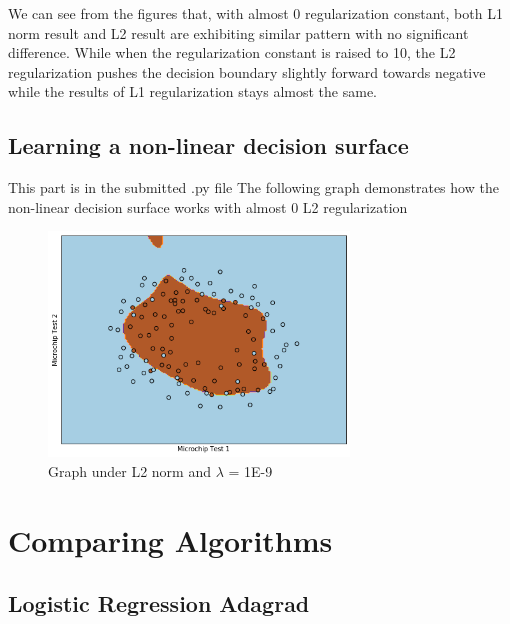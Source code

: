 \documentclass{article}
\begin{document}
	We can see from the figures that, with almost 0 regularization constant, both L1 norm result and L2 result are exhibiting similar pattern with no significant difference. While when the regularization constant is raised to 10, the L2 regularization pushes the decision boundary slightly forward towards negative while the results of L1 regularization stays almost the same.
	
	\subsection{Learning a non-linear decision surface}
	This part is in the submitted .py file
	The following graph demonstrates how the non-linear decision surface works with almost 0 L2 regularization
	\begin{figure}[H]
			\caption{Graph under L2 norm and $\lambda$ = 1E-9}
			\centering
			\includegraphics[width=8cm]{NonlinearL2norm0.png}
		\end{figure}
	\section{Comparing Algorithms}
		\subsection{Logistic Regression Adagrad}
	
	




        
\end{document}
